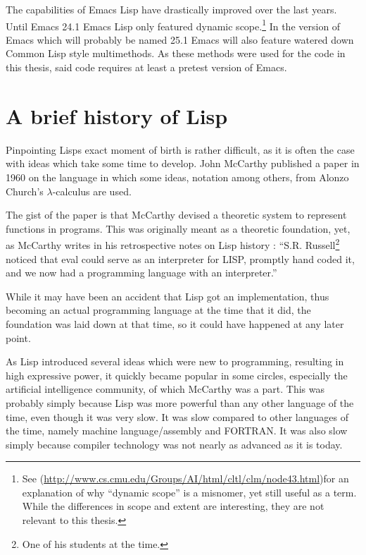 \documentclass[a4paper,10pt,twoside]{report}
\newcommand{\el}{Emacs Lisp}
\newcommand{\cl}{Common Lisp}
\begin{document}
The capabilities of \el{} have drastically improved over the last years.  Until
Emacs 24.1 \el{} only featured dynamic scope\cite{Emacs-Lexical}.\footnote{See
  \cite{CLTL2}
  (\url{http://www.cs.cmu.edu/Groups/AI/html/cltl/clm/node43.html})for an
  explanation of why ``dynamic scope'' is a misnomer, yet still useful as a
  term.  While the differences in scope and extent are interesting, they are not
  relevant to this thesis.}  In the version of Emacs which will probably be
named 25.1 Emacs will also feature watered down \cl{} style multimethods.  As
these methods were used for the code in this thesis, said code requires at least
a pretest version of Emacs\cite{emacs-pretest}.

\chapter{A brief history of Lisp}
\label{chapter:lisp-hist}

Pinpointing Lisps exact moment of birth is rather difficult, as it is often the
case with ideas which take some time to develop.  John McCarthy published a
paper in 1960 on the language\cite{rec-fun-sym-expr} in which some ideas,
notation among others, from Alonzo Church’s $\lambda$-calculus are used.

The gist of the paper is that McCarthy devised a theoretic system to represent
functions in programs.  This was originally meant as a theoretic foundation,
yet, as McCarthy writes in his retrospective notes on Lisp history
\cite{lisp-hist}: “S.R. Russell\footnote{One of his students at the time.}
noticed that eval could serve as an interpreter for LISP, promptly hand coded
it, and we now had a programming language with an interpreter.”

While it may have been an accident that Lisp got an implementation, thus
becoming an actual programming language at the time that it did, the foundation
was laid down at that time, so it could have happened at any later point.

As Lisp introduced several ideas which were new to programming, resulting in
high expressive power, it quickly became popular in some circles, especially the
artificial intelligence community, of which McCarthy was a part.  This was
probably simply because Lisp was more powerful than any other language of the
time, even though it was very slow.  It was slow compared to other languages of
the time, namely machine language/assembly and FORTRAN.  It was also slow simply
because compiler technology was not nearly as advanced as it is today.
\end{document}
